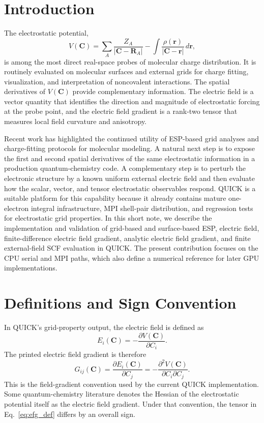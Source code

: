 \documentclass[journal=jcisd8,manuscript=article]{achemso}
\begin{document}
\section{Introduction}

The electrostatic potential,
\begin{equation}
  V(\mathbf{C}) =
  \sum_A \frac{Z_A}{|\mathbf{C}-\mathbf{R}_A|}
  -
  \int \frac{\rho(\mathbf{r})}{|\mathbf{C}-\mathbf{r}|}\,d\mathbf{r},
  \label{eq:esp}
\end{equation}
is among the most direct real-space probes of molecular charge distribution.  It is routinely evaluated on molecular surfaces and external grids for charge fitting, visualization, and interpretation of noncovalent interactions.  The spatial derivatives of \(V(\mathbf{C})\) provide complementary information.  The electric field is a vector quantity that identifies the direction and magnitude of electrostatic forcing at the probe point, and the electric field gradient is a rank-two tensor that measures local field curvature and anisotropy.

Recent work has highlighted the continued utility of ESP-based grid analyses and charge-fitting protocols for molecular modeling.\cite{previous_jcim}  A natural next step is to expose the first and second spatial derivatives of the same electrostatic information in a production quantum-chemistry code.  A complementary step is to perturb the electronic structure by a known uniform external electric field and then evaluate how the scalar, vector, and tensor electrostatic observables respond.  QUICK is a suitable platform for this capability because it already contains mature one-electron integral infrastructure, MPI shell-pair distribution, and regression tests for electrostatic grid properties.  In this short note, we describe the implementation and validation of grid-based and surface-based ESP, electric field, finite-difference electric field gradient, analytic electric field gradient, and finite external-field SCF evaluation in QUICK.  The present contribution focuses on the CPU serial and MPI paths, which also define a numerical reference for later GPU implementations.

\section{Definitions and Sign Convention}

In QUICK's grid-property output, the electric field is defined as
\begin{equation}
  E_i(\mathbf{C}) = -\frac{\partial V(\mathbf{C})}{\partial C_i}.
  \label{eq:efield_def}
\end{equation}
The printed electric field gradient is therefore
\begin{equation}
  G_{ij}(\mathbf{C}) =
  \frac{\partial E_i(\mathbf{C})}{\partial C_j}
  =
  -\frac{\partial^2 V(\mathbf{C})}{\partial C_i \partial C_j}.
  \label{eq:efg_def}
\end{equation}
This is the field-gradient convention used by the current QUICK implementation.  Some quantum-chemistry literature denotes the Hessian of the electrostatic potential itself as the electric field gradient.  Under that convention, the tensor in Eq.~\ref{eq:efg_def} differs by an overall sign.
\end{document}
